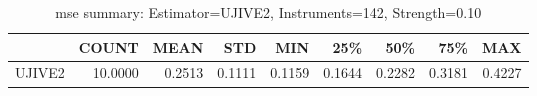 \begin{table}[ht]
\centering
\caption{mse summary: Estimator=UJIVE2, Instruments=142, Strength=0.10}
\begin{tabular}{lrrrrrrrr}
\toprule
 & COUNT & MEAN & STD & MIN & 25\% & 50\% & 75\% & MAX \\
\midrule
UJIVE2 & 10.0000 & 0.2513 & 0.1111 & 0.1159 & 0.1644 & 0.2282 & 0.3181 & 0.4227 \\
\bottomrule
\end{tabular}
\end{table}
